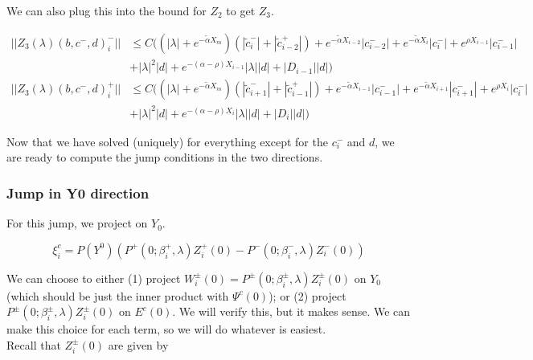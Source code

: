 \documentclass[12pt]{article}
\begin{document}
We can also plug this into the bound for $Z_2$ to get $Z_3$.

\begin{align*}
||Z_3(\lambda)(b,c^-,d)_i^-|| &\leq C ( (|\lambda| + e^{-\tilde{\alpha}X_m})(|\tilde{c}_i^-| + |\tilde{c}_{i-2}^+|) + e^{-\tilde{\alpha} X_{i-2}} |c_{i-2}^-| + e^{-\tilde{\alpha} X_i} |c_i^-| + e^{\rho X_{i-1}}|c_{i-1}^-| \\ 
&+ |\lambda|^2 |d| + e^{-(\alpha - \rho)X_{i-1}}|\lambda||d| + |D_{i-1}||d| ) \\
||Z_3(\lambda)(b,c^-,d)_i^+|| &\leq C \Big( (|\lambda| + e^{-\tilde{\alpha}X_m})(|\tilde{c}_{i+1}^-| + |\tilde{c}_{i-1}^+|) + e^{-\tilde{\alpha} X_{i-1}} |c_{i-1}^-| + e^{-\tilde{\alpha} X_{i+1}} |c_{i+1}^-| + e^{\rho X_i} |c_i^-| \\
&+ |\lambda|^2 |d| + e^{-(\alpha - \rho)X_i}|\lambda||d| + |D_i||d| \Big)
\end{align*}

Now that we have solved (uniquely) for everything except for the $c_i^-$ and $d$, we are ready to compute the jump conditions in the two directions.

\subsubsection*{Jump in Y0 direction}

For this jump, we project on $Y_0$.

\[
\xi^c_i = P(Y^0) ( P^+(0; \beta_i^+, \lambda) Z_i^+(0) - P^-(0; \beta_i^-, \lambda) Z_i^-(0) )
\]

We can choose to either (1) project $W_i^\pm(0) = P^\pm(0; \beta_i^\pm, \lambda) Z_i^\pm(0)$ on $Y_0$ (which should be just the inner product with $\Psi^c(0)$); or (2) project $P^\pm(0; \beta_i^\pm, \lambda)Z_i^\pm(0)$ on $E^c(0)$. We will verify this, but it makes sense. We can make this choice for each term, so we will do whatever is easiest.\\

Recall that $Z_i^\pm(0)$ are given by
\end{document}
